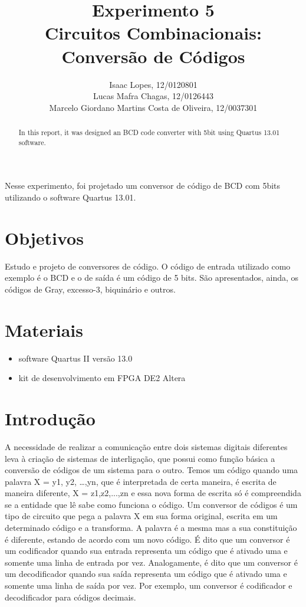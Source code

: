 \documentclass[12pt]{article}
\title{Experimento 5\\ 
Circuitos Combinacionais: Conversão de Códigos}
\author{Isaac Lopes, 12/0120801\\
	Lucas Mafra Chagas, 12/0126443 \\
	Marcelo Giordano Martins Costa de Oliveira,  12/0037301
}
\begin{document}
 

\maketitle

 \begin{abstract}
   In this report, it was designed an BCD code converter with 5bit using Quartus 13.01 software. 
 \end{abstract}
     
 \begin{resumo} 
  Nesse experimento, foi projetado um conversor de código de BCD com 5bits utilizando o software Quartus 13.01.
 \end{resumo}


\section{Objetivos}
\label{sec:Objetivos}

Estudo e projeto de conversores de código. O código de entrada utilizado como exemplo é o BCD e o de saída é um código de 5 bits. São apresentados, ainda, os códigos de Gray, excesso-3, biquinário e outros.

\section{Materiais} 
\label{sec:Materiais}

\begin{itemize}
    \item software Quartus II versão 13.0
    \item kit de desenvolvimento em FPGA DE2 Altera 
\end{itemize}


\section{Introdução}
\label{sec:Introducao}

A necessidade de realizar a comunicação entre dois sistemas digitais diferentes leva à criação de sistemas de interligação, que possui como função básica a conversão de códigos de um sistema para o outro.
Temos um código quando uma palavra X = {y1, y2, …,yn}, que é interpretada de certa maneira, é escrita de maneira diferente, X = {z1,z2,...,zn} e essa nova forma de escrita só é compreendida se a entidade que lê sabe como funciona o código. Um conversor de códigos é um tipo de circuito que pega a palavra X em sua forma original, escrita em um determinado código e a transforma. A palavra é a mesma mas a sua constituição é diferente, estando de acordo com um novo código.
É dito que um conversor é um codificador quando sua entrada representa um código que é ativado uma e somente uma linha de entrada por vez. Analogamente, é dito que um conversor é um decodificador quando sua saída representa um código que é ativado uma e somente uma linha de saída por vez. Por exemplo, um conversor é codificador e decodificador para códigos decimais.
\end{document}
